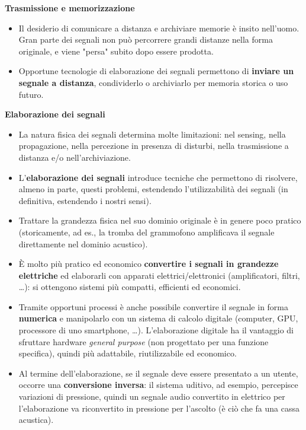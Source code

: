 \documentclass[12pt, a4paper]{article}
\begin{document}
\textbf{Trasmissione e memorizzazione}
\begin{itemize}
    \item Il desiderio di comunicare a distanza e archiviare memorie è insito nell'uomo. Gran parte dei segnali non può percorrere grandi distanze nella forma originale, e viene "persa" subito dopo essere prodotta.
    \item Opportune tecnologie di elaborazione dei segnali permettono di \textbf{inviare un segnale a distanza}, condividerlo o archiviarlo per memoria storica o uso futuro.
\end{itemize}

\textbf{Elaborazione dei segnali}
\begin{itemize}
    \item La natura fisica dei segnali determina molte limitazioni: nel sensing, nella propagazione, nella percezione in presenza di disturbi, nella trasmissione a distanza e/o nell'archiviazione.
    \item L'\textbf{elaborazione dei segnali} introduce tecniche che permettono di risolvere, almeno in parte, questi problemi, estendendo l'utilizzabilità dei segnali (in definitiva, estendendo i nostri sensi).
    \item Trattare la grandezza fisica nel suo dominio originale è in genere poco pratico (storicamente, ad es., la tromba del grammofono amplificava il segnale direttamente nel dominio acustico).
    \item È molto più pratico ed economico \textbf{convertire i segnali in grandezze elettriche} ed elaborarli con apparati elettrici/elettronici (amplificatori, filtri, \dots): si ottengono sistemi più compatti, efficienti ed economici.
    \item Tramite opportuni processi è anche possibile convertire il segnale in forma \textbf{numerica} e manipolarlo con un sistema di calcolo digitale (computer, GPU, processore di uno smartphone, \dots). L'elaborazione digitale ha il vantaggio di sfruttare hardware \textit{general purpose} (non progettato per una funzione specifica), quindi più adattabile, riutilizzabile ed economico.
    \item Al termine dell'elaborazione, se il segnale deve essere presentato a un utente, occorre una \textbf{conversione inversa}: il sistema uditivo, ad esempio, percepisce variazioni di pressione, quindi un segnale audio convertito in elettrico per l'elaborazione va riconvertito in pressione per l'ascolto (è ciò che fa una cassa acustica).
\end{itemize}
\end{document}
